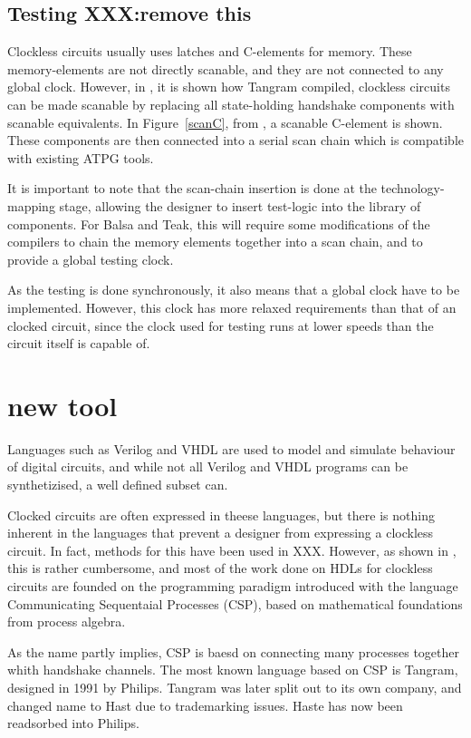 \subsection{Testing XXX:remove this}


Clockless circuits usually uses latches and C-elements for
memory. These memory-elements are not directly scanable, and they are
not connected to any global clock. However, in \cite{fullscan}, it is
shown how Tangram compiled, clockless circuits can be made scanable by
replacing all state-holding handshake components with scanable
equivalents. In Figure~\ref{scanC}, from \cite{fullscan}, a scanable
C-element is shown. These components are then connected into a serial
scan chain which is compatible with existing ATPG tools.

It is important to note that the scan-chain insertion is done at the
technology-mapping stage, allowing the designer to insert test-logic
into the library of components. For Balsa and Teak, this will require
some modifications of the compilers to chain the memory elements
together into a scan chain, and to provide a global testing clock.

As the testing is done synchronously, it also means that a global
clock have to be implemented. However, this clock has more relaxed
requirements than that of an clocked circuit, since the clock used for
testing runs at lower speeds than the circuit itself is capable of.

\section{new tool}


Languages such as Verilog and VHDL are used to model and simulate
behaviour of digital circuits, and while not all Verilog and VHDL
programs can be synthetizised, a well defined subset can.

Clocked circuits are often expressed in theese languages, but there is
nothing inherent in the languages that prevent a designer from
expressing a clockless circuit. In fact, methods for this have been
used in XXX. However, as shown in \cite[pp XXX]{sparso}, this is
rather cumbersome, and most of the work done on HDLs for clockless
circuits are founded on the programming paradigm introduced with the
language Communicating Sequentaial Processes (CSP)\cite{xxx}, based on
mathematical foundations from process algebra.

As the name partly implies, CSP is baesd on connecting many processes
together whith handshake channels. The most known language based on
CSP is Tangram, designed in 1991 by Philips. Tangram was later split
out to its own company, and changed name to Hast due to trademarking
issues. Haste has now been readsorbed into Philips.

